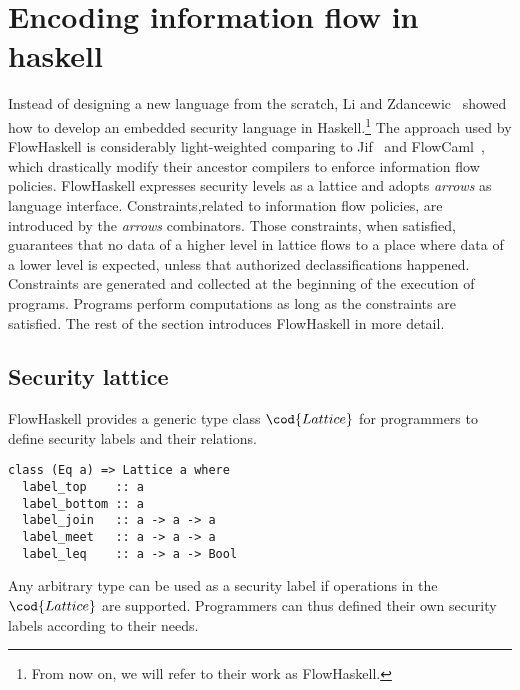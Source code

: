
\section{Encoding information flow in haskell}
Instead of designing a new language from the scratch, Li and 
Zdancewic~\cite{Li:Zdancewic:CSFW} showed how to develop an embedded security language 
in Haskell.\footnote{From now on, we will refer to their work as FlowHaskell.} 
The approach used by FlowHaskell is considerably light-weighted 
comparing to Jif~\cite{jif} and FlowCaml~\cite{FlowCaml}, which drastically modify their ancestor 
compilers to enforce information flow policies. 
FlowHaskell expresses security levels as a lattice and adopts {\em arrows} as language interface. 
Constraints,related to information flow policies, are introduced by the {\em arrows} combinators. 
Those constraints, when satisfied, guarantees that no data of a higher level in lattice flows 
to a place where data of a lower level is expected, unless that authorized declassifications happened.
Constraints are generated and collected at the beginning of the execution of programs. 
Programs perform computations as long as the constraints are satisfied.
The rest of the section introduces FlowHaskell in more detail.

\subsection{Security lattice}
\label{chap2:lattice}
FlowHaskell provides a generic type class $\cod{Lattice}$ for programmers to define security
labels and their relations. 
\begin{verbatim}
class (Eq a) => Lattice a where
  label_top    :: a
  label_bottom :: a
  label_join   :: a -> a -> a
  label_meet   :: a -> a -> a
  label_leq    :: a -> a -> Bool
\end{verbatim}
Any arbitrary type can be used as a security label if operations in the $\cod{Lattice}$ are
supported. Programmers can thus defined their own security labels according to their needs.

